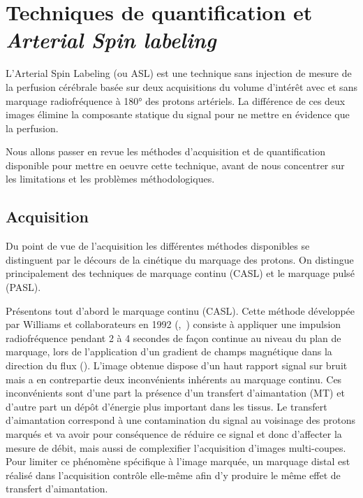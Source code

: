 
\chapter{Techniques de quantification et {\em Arterial Spin labeling}}
\label{chap:asl}
	\minitoc


L’Arterial Spin Labeling (ou ASL) est une technique sans injection de mesure de la perfusion cérébrale basée sur deux acquisitions du volume d’intérêt avec et sans marquage radiofréquence à 180° des protons artériels. La différence de ces deux images élimine la composante statique du signal pour ne mettre en évidence que la perfusion.

Nous allons passer en revue les méthodes d’acquisition et de quantification disponible pour mettre en oeuvre cette technique, avant de nous concentrer sur les limitations et les problèmes méthodologiques.
\section{Acquisition}
Du point de vue de l’acquisition les différentes méthodes disponibles se distinguent par le décours de la cinétique du marquage des protons. On distingue principalement des techniques de marquage continu (CASL) et le marquage pulsé (PASL).

Présentons tout d’abord le marquage continu (CASL). Cette méthode développée par Williams et collaborateurs en 1992  (\cite{Detre1992},~\cite{Williams1992}) consiste à appliquer une impulsion radiofréquence pendant 2 à 4 secondes de façon continue au niveau du plan de marquage, lors de l’application d’un gradient de champs magnétique dans la direction du flux (\cite{Ferre2011}). L’image obtenue dispose d’un haut rapport signal sur bruit mais a en contrepartie deux inconvénients inhérents au marquage continu. Ces inconvénients sont d’une part la présence d’un transfert d’aimantation (MT) et d’autre part un dépôt d’énergie plus important dans les tissus. Le transfert d’aimantation correspond à une contamination du signal au voisinage des protons marqués et va avoir pour conséquence de réduire ce signal et donc d’affecter la mesure de débit, mais aussi de complexifier l’acquisition d’images multi-coupes. Pour limiter ce phénomène spécifique à l’image marquée, un marquage distal est réalisé dans l’acquisition contrôle elle-même afin d’y produire le même effet de transfert d’aimantation.

